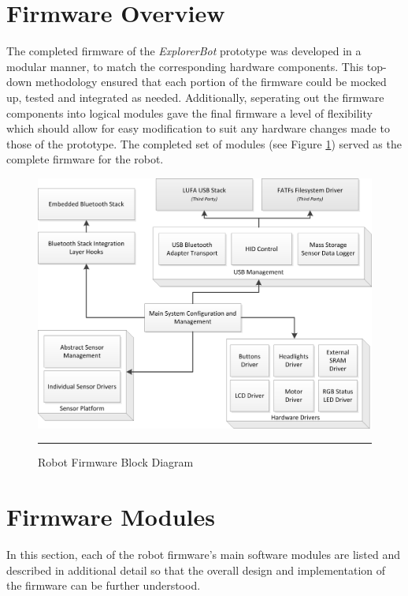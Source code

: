 \section{Firmware Overview}

The completed firmware of the \textit{ExplorerBot} prototype was developed in a modular manner, to match the corresponding hardware components. This top-down methodology ensured that each portion of the firmware could be mocked up, tested and integrated as needed. Additionally, seperating out the firmware components into logical modules gave the final firmware a level of flexibility which should allow for easy modification to suit any hardware changes made to those of the prototype. The completed set of modules (see Figure \ref{fig:robotblockfw}) served as the complete firmware for the robot.

\begin{figure}[H]
	\vspace{1em}
	\centering
		\includegraphics[width=140mm]{./Figures/FirmwareBlockDiagram.png}
	\rule{35em}{0.5pt}
	\caption[Firmware Block Diagram]{Robot Firmware Block Diagram}
	\label{fig:robotblockfw}
\end{figure}

\section{Firmware Modules}

In this section, each of the robot firmware's main software modules are listed and described in additional detail so that the overall design and implementation of the firmware can be further understood.

